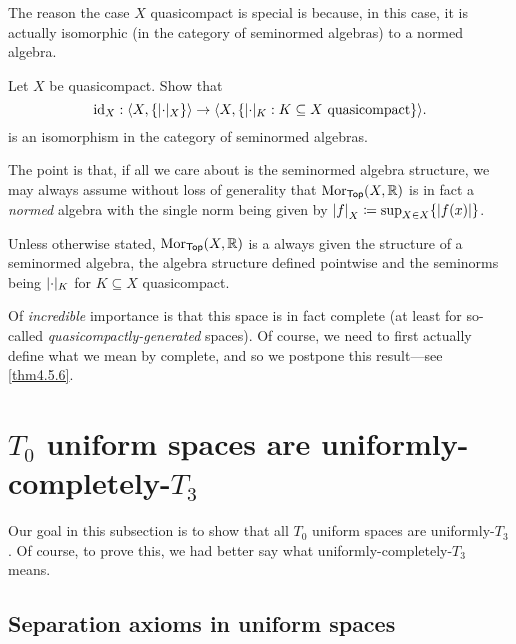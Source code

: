 \begin{exm}
The reason the case $X$ quasicompact is special is because, in this case, it is actually isomorphic (in the category of seminormed algebras) to a normed algebra.
\begin{exr}
Let $X$ be quasicompact.  Show that
\begin{equation}
\id _X:\coord{X,\{ \norm _X\}}\rightarrow \coord{X,\{ \norm _K:K\subseteq X\text{ quasicompact}\}} .
\end{equation}
is an isomorphism in the category of seminormed algebras.
\begin{rmk}
The point is that, if all we care about is the seminormed algebra structure, we may always assume without loss of generality that $\operatorname{Mor} _{\mathsf{Top}}(X,\mathbb{R} )$ is in fact a \emph{normed} algebra with the single norm being given by $\norm[f]_X\coloneqq \sup _{X\in X}\{ \abs{f(x)}\}$.
\end{rmk}
\end{exr}
\begin{textequation}
Unless otherwise stated, $\operatorname{Mor} _{\mathsf{Top}}(X,\mathbb{R} )$ is a always given the structure of a seminormed algebra, the algebra structure defined pointwise and the seminorms being $\norm _K$ for $K\subseteq X$ quasicompact.
\end{textequation}

Of \emph{incredible} importance is that this space is in fact complete (at least for so-called \emph{quasicompactly-generated} spaces).  Of course, we need to first actually define what we mean by complete, and so we postpone this result---see \cref{thm4.5.6}.
\end{exm}

\section{$T_0$ uniform spaces are uniformly-completely-$T_3$}

Our goal in this subsection is to show that all $T_0$ uniform spaces are uniformly-$T_3$.  Of course, to prove this, we had better say what uniformly-completely-$T_3$ means.

\subsection{Separation axioms in uniform spaces}

